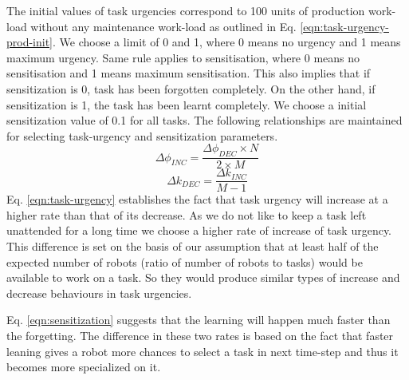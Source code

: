 \documentclass[smallcondensed]{svjour3}
\begin{document}
The initial values of task urgencies correspond to 100 units of production work-load without any maintenance work-load as outlined in Eq. \ref{eqn:task-urgency-prod-init}. We choose a limit of 0 and 1, where 0 means no urgency and 1 means maximum urgency. Same rule applies to sensitisation, where 0 means no sensitisation and 1 means maximum sensitisation. This also implies that if sensitization is 0, task has been forgotten completely. On the other hand, if sensitization is 1, the task has been learnt completely. We choose a initial sensitization value of 0.1 for all tasks. The following relationships are maintained for selecting task-urgency and sensitization parameters.
\begin{equation}
\Delta\phi_{INC} = \frac{\Delta\phi_{DEC} \times N}{2 \times M}
\label{eqn:task-urgency}
\end{equation}
%
\begin{equation}
\Delta k_{DEC} = \frac{\Delta k_{INC}} {M - 1} 
\label{eqn:sensitization}
\end{equation}
%
Eq. \ref{eqn:task-urgency} establishes the fact that task urgency will increase at a higher rate than that of its decrease. As we do not like to keep a task left unattended for a long time we choose a higher rate of increase of task urgency. This difference is set on the basis of our assumption that at least half of the expected number of robots (ratio of number of robots to tasks) would be available to work on a task. So they would produce similar types of increase and decrease behaviours in task urgencies.

Eq. \ref{eqn:sensitization} suggests that the learning will happen much faster than the forgetting. The difference in these two rates is based on the fact that faster leaning gives a robot more chances to select a task in next time-step and thus it becomes more specialized on it.
\end{document}
